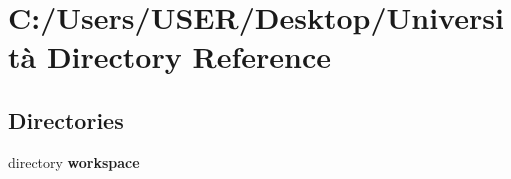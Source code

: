 \section{C\+:/\+Users/\+U\+S\+E\+R/\+Desktop/\+Università Directory Reference}
\label{dir_10632e7ee9328e99361b5dfc43c54996}
\subsection*{Directories}
\begin{DoxyCompactItemize}
\item 
directory \textbf{ workspace}
\end{DoxyCompactItemize}
